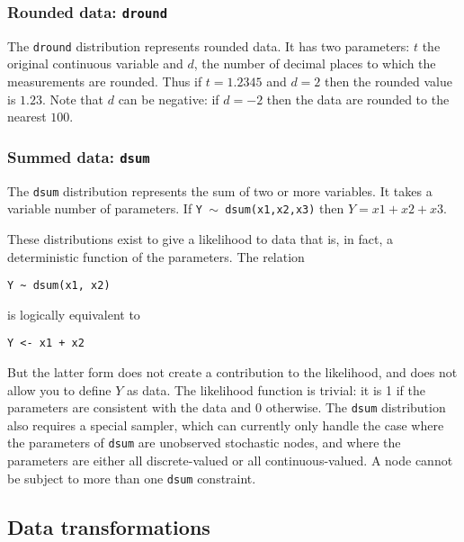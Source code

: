 \documentclass[11pt, a4paper, titlepage]{report}
\begin{document}
\subsubsection{Rounded data: \texttt{dround}}

The \texttt{dround} distribution represents rounded data. It has two
parameters: $t$ the original continuous variable and $d$, the number
of decimal places to which the measurements are rounded. Thus if
$t=1.2345$ and $d=2$ then the rounded value is $1.23$. Note that $d$
can be negative: if $d=-2$ then the data are rounded to the nearest
$100$.

\subsubsection{Summed data: \texttt{dsum}}

The \texttt{dsum} distribution represents the sum of two or more
variables.  It takes a variable number of parameters. If \texttt{Y $\sim$
dsum(x1,x2,x3)} then $Y=x1+x2+x3$.

These distributions exist to give a likelihood to data that is, in fact,
a deterministic function of the parameters.  The relation
\begin{verbatim}
Y ~ dsum(x1, x2)
\end{verbatim}
is logically equivalent to
\begin{verbatim}
Y <- x1 + x2
\end{verbatim}
But the latter form does not create a contribution to the likelihood,
and does not allow you to define $Y$ as data.  The likelihood function
is trivial: it is 1 if the parameters are consistent with the data and
0 otherwise.  The \texttt{dsum} distribution also requires a special
sampler, which can currently only handle the case where the parameters
of \texttt{dsum} are unobserved stochastic nodes, and where the
parameters are either all discrete-valued or all continuous-valued. A node
cannot be subject to more than one \texttt{dsum} constraint.

\subsection{Data transformations}
\label{section:data:tranformations}
\end{document}
